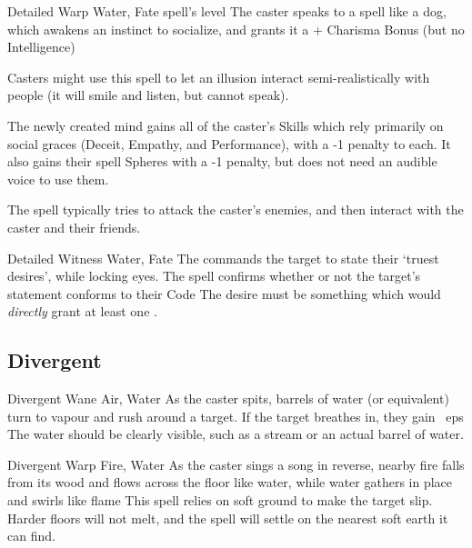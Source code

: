 \begin{multicols}{2}



  {Detailed}%
  {Warp}%
  {Water, Fate}%
  {spell's level}%
  {The caster speaks to a spell like a dog, which awakens an instinct to socialize, and grants it a + Charisma Bonus (but no Intelligence)}%
  {
  Casters might use this spell to let an illusion interact semi-realistically with people (it will smile and listen, but cannot speak).

  The newly created mind gains all of the caster's Skills which rely primarily on social graces (Deceit, Empathy, and Performance), with a -1 penalty to each.
  It also gains their spell Spheres with a -1 penalty, but does not need an audible voice to use them.

  The spell typically tries to attack the caster's enemies, and then interact with the caster and their friends.

  }

  {Detailed}%
  {Witness}%
  {Water, Fate}%
  {}%
  {The  commands the target to state their `truest desires', while locking eyes.
    The spell confirms whether or not the target's statement conforms to their Code}%
  {The desire must be something which would \textit{directly} grant at least one .%
  }

\subsection{Divergent}

  {Divergent}%
  {Wane}%
  {Air, Water}%
  {}%
  {As the caster spits,  barrels of water (or equivalent) turn to vapour and rush around a target.
  If the target breathes in, they gain ~\glspl{ep}}%
  {
    The water should be clearly visible, such as a stream or an actual barrel of water.}

  {Divergent}%
  {Warp}%
  {Fire, Water}%
  {}%
  {As the caster sings a song in reverse, nearby fire falls from its wood and flows across the floor like water, while water gathers in place and swirls like flame}%
  {
  This spell relies on soft ground to make the target slip.
  Harder floors will not melt, and the spell will settle on the nearest soft earth it can find.}


\end{multicols}

